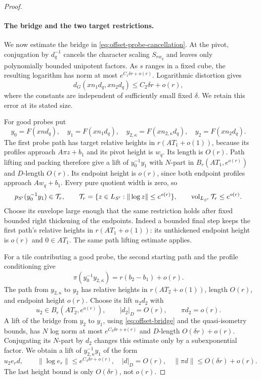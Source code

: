 \begin{proof}
\paragraph{The bridge and the two target restrictions.}
We now estimate the bridge in \eqref{eq:offset-probe-cancellation}.
At the pivot, conjugation by $d_q^{-1}$ cancels the character scaling
$S_{rw_q}$ and leaves only polynomially bounded unipotent factors.  As $s$
ranges in a fixed cube, the resulting logarithm has norm at most
$e^{C_1\delta r+o(r)}$.  Logarithmic distortion gives
\begin{equation}
 d_G(xn_1d_q,xn_2d_q)\le C_2\delta r+o(r),
 \label{eq:offset-bridge}
\end{equation}
where the constants are independent of sufficiently small fixed
$\delta$.  We retain this error at its stated size.

For good probes put
\[
 y_0=F(xnd_q),\quad y_1=F(xn_1d_q),\quad
 y_{2,\kappa}=F(xn_{2,\kappa}d_q),\quad y_2=F(xn_2d_q).
\]
The first probe path has target relative heights in
$r(AT_1+o(1))$, because its profiles approach $A\pi z+b_1$ and its pivot
height is $w_q$.  Its length is $O(r)$.  Path lifting and packing therefore
give a lift of $y_0^{-1}y_1$ with $N$-part in
$B_r(AT_1,e^{o(r)})$ and $D$-length $O(r)$.
Its endpoint height is $o(r)$, since both endpoint profiles approach
$Aw_q+b_1$.  Every pure quotient width is zero, so
\begin{equation}
 p_{S'}(y_0^{-1}y_1)\in \mathcal T_r,
 \qquad
 \mathcal T_r=\{z\in L_{S'}:\|\log z\|\le e^{o(r)}\},
 \qquad \operatorname{vol}_{L_{S'}}\mathcal T_r\le e^{o(r)}.
 \label{eq:offset-first-quotient}
\end{equation}
Choose its envelope large enough that the same restriction holds after
fixed bounded right thickening of the endpoints.  Indeed a bounded final
step keeps the first path's relative heights in $r(AT_1+o(1))$: its
unthickened endpoint height is $o(r)$ and $0\in AT_1$.  The same path
lifting estimate applies.

For a tile contributing a good probe, the second starting path and the
profile conditioning give
\begin{equation}
 \pi(y_0^{-1}y_{2,\kappa})=r(b_2-b_1)+o(r).
 \label{eq:offset-anchor-height}
\end{equation}
The path from $y_{2,\kappa}$ to $y_2$ has relative heights in
$r(AT_2+o(1))$, length $O(r)$, and endpoint height $o(r)$.
Choose its lift $u_2d_2$ with
\[
 u_2\in B_r(AT_2,e^{o(r)}),\qquad
 |d_2|_D=O(r),\qquad \pi d_2=o(r).
\]
A lift of the bridge from $y_2$ to $y_1$, using
\eqref{eq:offset-bridge} and the quasi-isometry bounds, has $N$ log norm
at most $e^{C_3\delta r+o(r)}$ and $D$-length $O(\delta r)+o(r)$.
Conjugating its $N$-part by $d_2$ changes this estimate only by a
subexponential factor.  We obtain a lift of $y_{2,\kappa}^{-1}y_1$ of the form
\begin{equation}
 u_2 e_r d,
 \qquad \|\log e_r\|\le e^{C_4\delta r+o(r)},\quad
 |d|_D=O(r),\quad \|\pi d\|\le O(\delta r)+o(r).
 \label{eq:offset-lift-with-error}
\end{equation}
The last height bound is only $O(\delta r)$, not $o(r)$.


\end{proof}
